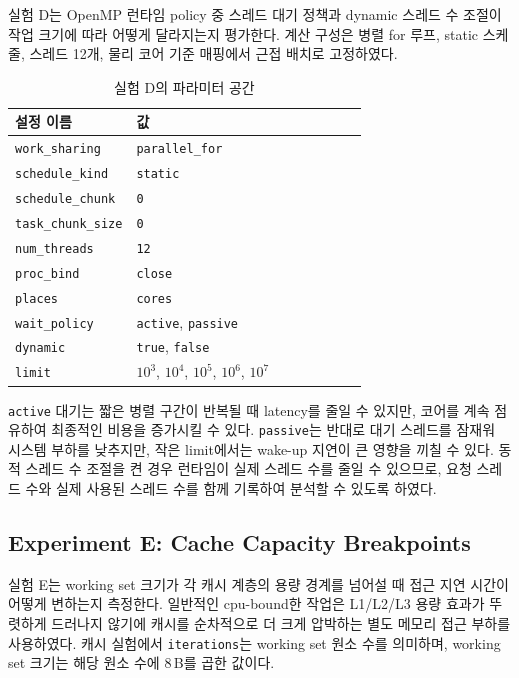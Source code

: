 \documentclass[11pt,a4paper]{article}
\begin{document}
실험 D는 OpenMP 런타임 policy 중 스레드 대기 정책과 dynamic 스레드 수 조절이 작업 크기에 따라 어떻게 달라지는지 평가한다. 계산 구성은 병렬 for 루프, static 스케줄, 스레드 12개, 물리 코어 기준 매핑에서 근접 배치로 고정하였다.

\begin{table}[h]
\centering
\begin{tabular}{lp{0.70\linewidth}}
\toprule
설정 이름 & 값 \\
\midrule
\texttt{work\_sharing} & \texttt{parallel\_for} \\
\texttt{schedule\_kind} & \texttt{static} \\
\texttt{schedule\_chunk} & \texttt{0} \\
\texttt{task\_chunk\_size} & \texttt{0} \\
\texttt{num\_threads} & \texttt{12} \\
\texttt{proc\_bind} & \texttt{close} \\
\texttt{places} & \texttt{cores} \\
\texttt{wait\_policy} & \texttt{active}, \texttt{passive} \\
\texttt{dynamic} & \texttt{true}, \texttt{false} \\
\texttt{limit} & $10^3$, $10^4$, $10^5$, $10^6$, $10^7$ \\
\bottomrule
\end{tabular}
\caption{실험 D의 파라미터 공간}
\label{tab:expD-space}
\end{table}

\texttt{active} 대기는 짧은 병렬 구간이 반복될 때 latency를 줄일 수 있지만, 코어를 계속 점유하여 최종적인 비용을 증가시킬 수 있다. \texttt{passive}는 반대로 대기 스레드를 잠재워 시스템 부하를 낮추지만, 작은 limit에서는 wake-up 지연이 큰 영향을 끼칠 수 있다. 동적 스레드 수 조절을 켠 경우 런타임이 실제 스레드 수를 줄일 수 있으므로, 요청 스레드 수와 실제 사용된 스레드 수를 함께 기록하여 분석할 수 있도록 하였다.

\subsection{Experiment E: Cache Capacity Breakpoints}

실험 E는 working set 크기가 각 캐시 계층의 용량 경계를 넘어설 때 접근 지연 시간이 어떻게 변하는지 측정한다. 일반적인 cpu-bound한 작업은 L1/L2/L3 용량 효과가 뚜렷하게 드러나지 않기에 캐시를 순차적으로 더 크게 압박하는 별도 메모리 접근 부하를 사용하였다. 캐시 실험에서 \texttt{iterations}는 working set 원소 수를 의미하며, working set 크기는 해당 원소 수에 8\,B를 곱한 값이다.
\end{document}

